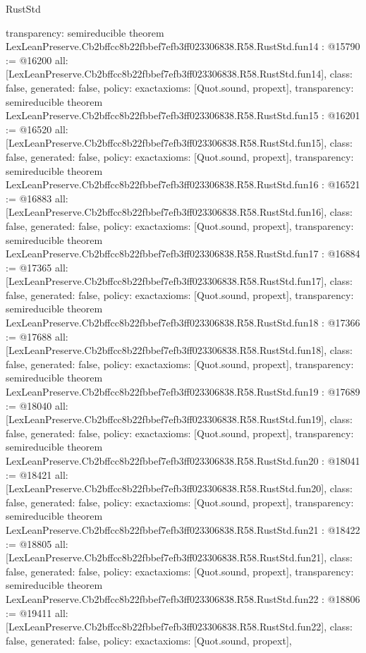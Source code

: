 \begin{lexlean}{RustStd}
\begin{coremodule}
{  transparency: semireducible
}
theorem LexLeanPreserve.Cb2bffcc8b22fbbef7efb3ff023306838.R58.RustStd.fun14 : @15790 := @16200 {
  all: [LexLeanPreserve.Cb2bffcc8b22fbbef7efb3ff023306838.R58.RustStd.fun14],
  class: false,
  generated: false,
  policy: exact{axioms: [Quot.sound, propext]},
  transparency: semireducible
}
theorem LexLeanPreserve.Cb2bffcc8b22fbbef7efb3ff023306838.R58.RustStd.fun15 : @16201 := @16520 {
  all: [LexLeanPreserve.Cb2bffcc8b22fbbef7efb3ff023306838.R58.RustStd.fun15],
  class: false,
  generated: false,
  policy: exact{axioms: [Quot.sound, propext]},
  transparency: semireducible
}
theorem LexLeanPreserve.Cb2bffcc8b22fbbef7efb3ff023306838.R58.RustStd.fun16 : @16521 := @16883 {
  all: [LexLeanPreserve.Cb2bffcc8b22fbbef7efb3ff023306838.R58.RustStd.fun16],
  class: false,
  generated: false,
  policy: exact{axioms: [Quot.sound, propext]},
  transparency: semireducible
}
theorem LexLeanPreserve.Cb2bffcc8b22fbbef7efb3ff023306838.R58.RustStd.fun17 : @16884 := @17365 {
  all: [LexLeanPreserve.Cb2bffcc8b22fbbef7efb3ff023306838.R58.RustStd.fun17],
  class: false,
  generated: false,
  policy: exact{axioms: [Quot.sound, propext]},
  transparency: semireducible
}
theorem LexLeanPreserve.Cb2bffcc8b22fbbef7efb3ff023306838.R58.RustStd.fun18 : @17366 := @17688 {
  all: [LexLeanPreserve.Cb2bffcc8b22fbbef7efb3ff023306838.R58.RustStd.fun18],
  class: false,
  generated: false,
  policy: exact{axioms: [Quot.sound, propext]},
  transparency: semireducible
}
theorem LexLeanPreserve.Cb2bffcc8b22fbbef7efb3ff023306838.R58.RustStd.fun19 : @17689 := @18040 {
  all: [LexLeanPreserve.Cb2bffcc8b22fbbef7efb3ff023306838.R58.RustStd.fun19],
  class: false,
  generated: false,
  policy: exact{axioms: [Quot.sound, propext]},
  transparency: semireducible
}
theorem LexLeanPreserve.Cb2bffcc8b22fbbef7efb3ff023306838.R58.RustStd.fun20 : @18041 := @18421 {
  all: [LexLeanPreserve.Cb2bffcc8b22fbbef7efb3ff023306838.R58.RustStd.fun20],
  class: false,
  generated: false,
  policy: exact{axioms: [Quot.sound, propext]},
  transparency: semireducible
}
theorem LexLeanPreserve.Cb2bffcc8b22fbbef7efb3ff023306838.R58.RustStd.fun21 : @18422 := @18805 {
  all: [LexLeanPreserve.Cb2bffcc8b22fbbef7efb3ff023306838.R58.RustStd.fun21],
  class: false,
  generated: false,
  policy: exact{axioms: [Quot.sound, propext]},
  transparency: semireducible
}
theorem LexLeanPreserve.Cb2bffcc8b22fbbef7efb3ff023306838.R58.RustStd.fun22 : @18806 := @19411 {
  all: [LexLeanPreserve.Cb2bffcc8b22fbbef7efb3ff023306838.R58.RustStd.fun22],
  class: false,
  generated: false,
  policy: exact{axioms: [Quot.sound, propext]},
}
\end{coremodule}
\end{lexlean}
